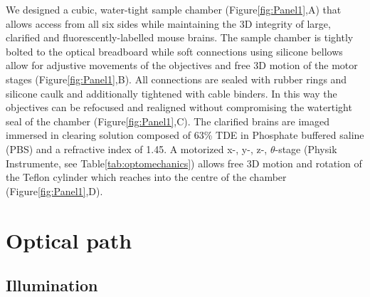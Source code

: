 \documentclass[12pt]{spieman}  %
\begin{document}
We designed a cubic, water-tight sample chamber (Figure\ref{fig:Panel1},A) that allows access from all six sides while maintaining the 3D integrity of large, clarified and fluorescently-labelled mouse brains. The sample chamber is tightly bolted  to the optical breadboard while soft connections using silicone bellows allow for adjustive movements of the objectives and free 3D motion of the motor stages (Figure\ref{fig:Panel1},B). All connections are sealed with rubber rings and silicone caulk and additionally tightened with cable binders. In this way the objectives can be refocused and realigned without compromising the watertight seal of the chamber (Figure\ref{fig:Panel1},C). The clarified brains are imaged immersed in clearing solution composed of 63\% TDE in Phosphate buffered saline (PBS) and a refractive index of 1.45. A motorized x-, y-, z-, $\theta$-stage (Physik Instrumente, see Table\ref{tab:optomechanics}) allows free 3D motion and rotation of the Teflon cylinder which reaches into the centre of the chamber (Figure\ref{fig:Panel1},D). 		
		
	\section{Optical path}

	\subsection{Illumination}
		
\end{document}
